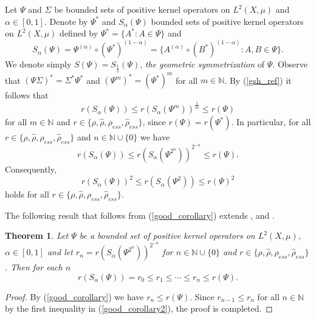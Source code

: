 \documentclass[12pt, reqno]{amsart}
\newtheorem{theorem}{Theorem}[section]
\theoremstyle{definition}
\theoremstyle{remark}
\numberwithin{equation}{section}
\newcommand{\be}{\begin{equation}}
\newcommand{\ee}{\end{equation}}
\newcommand{\NN}{\mathbb{N}}
\begin{document}
Let $\Psi$ and $\Sigma$ be bounded sets of positive kernel operators on $L^2(X,\mu)$ and $\alpha \in [0,1]$. Denote by  $\Psi ^*$ and $S_{\alpha}(\Psi)$  bounded sets of positive kernel operators on $L^2(X,\mu)$ defined by 
$\Psi ^* =\{A^* : A \in \Psi\}$ and
$$S_{\alpha}(\Psi) = \Psi ^{(\alpha)} \circ (\Psi ^*)^{(1-\alpha)} =\{ A ^{(\alpha)} \circ (B^*)^{(1-\alpha)}:A,B \in \Psi\}.$$
We denote simply $S(\Psi)=S_{\frac{1}{2}}(\Psi)$, {\it the geometric symmetrization} of $\Psi$.
Observe that $(\Psi \Sigma)^*= \Sigma ^* \Psi ^*$ and $(\Psi ^m)^* = (\Psi ^*)^m$ for all $m \in \NN$.
By (\ref{gsh_ref}) it follows that
\be
r(S_{\alpha}(\Psi)) \le  r (S_{\alpha}( \Psi ^{m}))^{\frac{1}{m}} \le r(\Psi)
\label{good_corollary_2}
\ee
for all $m \in \mathbb{N}$ and $r\in \{ \rho , \hat{\rho} , \rho _{ess}, \hat{\rho} _{ess}\}$, since $r(\Psi) = r(\Psi ^*)$.
In particular, for all $r\in \{ \rho , \hat{\rho} , \rho _{ess}, \hat{\rho} _{ess}\}$ and 
$n \in \mathbb{N}\cup \{0\}$ we have 
\be
r(S_{\alpha}(\Psi)) \le  r (S_{\alpha}( \Psi ^{2^n}))^{2^{-n}} \le r(\Psi).
\label{good_corollary}
\ee
 Consequently,
\be
r (S_{\alpha}(\Psi ))^2 \le r (S_{\alpha}(\Psi ^2)) \le r(\Psi)^2
\label{good_corollary2}
\ee
holds for all $r\in \{ \rho , \hat{\rho} , \rho _{ess}, \hat{\rho} _{ess}\}$.


The following result that follows from (\ref{good_corollary}) extends 
\cite[Theorem 2.2]{Drn}, \cite[Theorem 3.5]{P21} and \cite[Theorem 3.5(i)]{BP21}. %
\begin{theorem}
\label{...+drnovsek}
 Let $\Psi$ be a bounded set of positive kernel operators on $L^2(X,\mu)$, $\alpha \in [0,1]$ and let 
$r_n = r (S_{\alpha}( \Psi ^{2^n}))^{2^{-n}} $ for $n \in \mathbb{N}\cup \{0\}$ and 
$r\in \{ \rho , \hat{\rho} , \rho _{ess}, \hat{\rho} _{ess}\}$. 
Then for each $n$
$$ r (S_{\alpha}(\Psi))= r_0 \le r_1 \le \cdots \le r_n \le r (\Psi).$$	
\end{theorem}
\begin{proof}
By (\ref{good_corollary}) we have %
$r_n \le r(\Psi)$. Since $r_{n-1}\le r_n$ for all $n \in \mathbb{N}$ by the first inequality in  (\ref{good_corollary2}), the proof is completed.
\end{proof}
\end{document}
